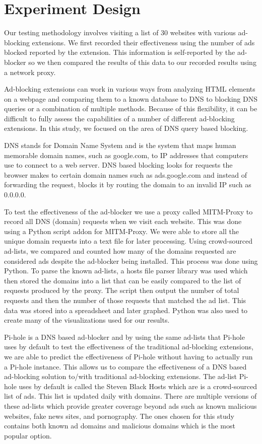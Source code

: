 \documentclass[sigsmall]{acmart}
\begin{document}
\section*{Experiment Design}\label{ED}
Our testing methodology involves visiting a list of 30 websites with various ad-blocking extensions. We first recorded their effectiveness using the number of ads blocked reported by the extension. This information is self-reported by the ad-blocker so we then compared the results of this data to our recorded results using a network proxy.

Ad-blocking extensions can work in various ways from analyzing HTML elements on a webpage and comparing them to a known database to DNS to blocking DNS queries or a combination of multiple methods. Because of this flexibility, it can be difficult to fully assess the capabilities of a number of different ad-blocking extensions. In this study, we focused on the area of DNS query based blocking.

DNS stands for Domain Name System and is the system that maps human memorable domain names, such as google.com, to IP addresses that computers use to connect to a web server. DNS based blocking looks for requests the browser makes to certain domain names such as ads.google.com and instead of forwarding the request, blocks it by routing the domain to an invalid IP such as 0.0.0.0.

To test the effectiveness of the ad-blocker we use a proxy called MITM-Proxy to record all DNS (domain) requests when we visit each website. This was done using a Python script addon for MITM-Proxy. We were able to store all the unique domain requests into a text file for later processing. Using crowd-sourced ad-lists, we compared and counted how many of the domains requested are considered ads despite the ad-blocker being installed. This process was done using Python. To parse the known ad-lists, a hosts file parser library was used which then stored the domains into a list that can be easily compared to the list of requests produced by the proxy. The script then output the number of total requests and then the number of those requests that matched the ad list. This data was stored into a spreadsheet and later graphed. Python was also used to create many of the visualizations used for our results.

Pi-hole is a DNS based ad-blocker and by using the same ad-lists that Pi-hole uses by default to test the effectiveness of the traditional ad-blocking extensions, we are able to predict the effectiveness of Pi-hole without having to actually run a Pi-hole instance. This allows us to compare the effectiveness of a DNS based ad-blocking solution to/with traditional ad-blocking extensions. The ad-list Pi-hole uses by default is called the Steven Black Hosts which are is a crowd-sourced list of ads. This list is updated daily with domains. There are multiple versions of these ad-lists which provide greater coverage beyond ads such as known malicious websites, fake news sites, and pornography. The ones chosen for this study contains both known ad domains and malicious domains which is the most popular option.
\end{document}
